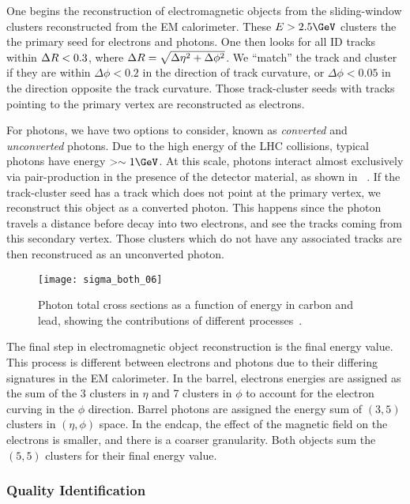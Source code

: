 One begins the reconstruction of electromagnetic objects from the sliding-window clusters reconstructed from the EM calorimeter.
These $E > 2.5 \GeV$ clusters the the primary seed for electrons and photons.
One then looks for all ID tracks within $\Delta R < 0.3$, where $\Delta R = \sqrt{\Delta\eta^2 + \Delta\phi^2}$.
We ``match'' the track and cluster if they are within $\Delta \phi < 0.2$ in the direction of track curvature, or $\Delta \phi < 0.05$ in the direction opposite the track curvature.
Those track-cluster seeds with tracks pointing to the primary vertex are reconstructed as electrons.

For photons, we have two options to consider, known as \textit{converted} and \textit{unconverted} photons.
Due to the high energy of the LHC collisions, typical photons have energy $ >\order 1 \GeV$.
At this scale, photons interact almost exclusively via pair-production in the presence of the detector material, as shown in  ~\cite{Agashe:2014kda}.
If the track-cluster seed has a track which does not point at the primary vertex, we reconstruct this object as a converted photon.
This happens since the photon travels a distance before decay into two electrons, and see the tracks coming from this secondary vertex.
Those clusters which do not have any associated tracks are then reconstruced as an unconverted photon.
\begin{figure}
\caption{Photon total cross sections as a function of energy in carbon and lead, showing the contributions of different processes~\cite{Agashe:2014kda}.} \label{fig:photon_pair_production}
\texttt{[image: sigma\_both\_06]}
\end{figure}

The final step in electromagnetic object reconstruction is the final energy value.
This process is different between electrons and photons due to their differing signatures in the EM calorimeter.
In the barrel, electrons energies are assigned as the sum of the 3 clusters in $\eta$ and 7 clusters in $\phi$ to account for the electron curving in the $\phi$ direction.
Barrel photons are assigned the energy sum of $(3,5)$ clusters in $(\eta, \phi)$ space.
In the endcap, the effect of the magnetic field on the electrons is smaller, and there is a coarser granularity.
Both objects sum the $(5,5)$ clusters for their final energy value.

\subsubsection{Quality Identification}

